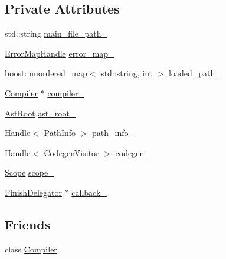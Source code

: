 \subsection*{Private Attributes}
\begin{DoxyCompactItemize}
\item 
std::string \hyperlink{classmocha_1_1_compiler_1_1_ptr_impl_afcc8e563ce271f85ea12dc210e37aa25}{main\_\-file\_\-path\_\-}
\item 
\hyperlink{classmocha_1_1_handle}{ErrorMapHandle} \hyperlink{classmocha_1_1_compiler_1_1_ptr_impl_ad1223329a891180cf83507aa0b76d2d5}{error\_\-map\_\-}
\item 
boost::unordered\_\-map$<$ std::string, int $>$ \hyperlink{classmocha_1_1_compiler_1_1_ptr_impl_a643001afd824defc612edd827e989347}{loaded\_\-path\_\-}
\item 
\hyperlink{classmocha_1_1_compiler}{Compiler} $\ast$ \hyperlink{classmocha_1_1_compiler_1_1_ptr_impl_adc125764e2552f0aa8485a660154c42c}{compiler\_\-}
\item 
\hyperlink{classmocha_1_1_ast_root}{AstRoot} \hyperlink{classmocha_1_1_compiler_1_1_ptr_impl_aa3e10b635c9b30e4b6ae1f8231e09655}{ast\_\-root\_\-}
\item 
\hyperlink{classmocha_1_1_handle}{Handle}$<$ \hyperlink{classmocha_1_1_path_info}{PathInfo} $>$ \hyperlink{classmocha_1_1_compiler_1_1_ptr_impl_a06189a50f7b98891cf31729de136e330}{path\_\-info\_\-}
\item 
\hyperlink{classmocha_1_1_handle}{Handle}$<$ \hyperlink{classmocha_1_1_codegen_visitor}{CodegenVisitor} $>$ \hyperlink{classmocha_1_1_compiler_1_1_ptr_impl_a95fb6e134b0d031f52ce39a7e349ee8f}{codegen\_\-}
\item 
\hyperlink{classmocha_1_1_scope}{Scope} \hyperlink{classmocha_1_1_compiler_1_1_ptr_impl_a967217946616587d9925a71ac093355b}{scope\_\-}
\item 
\hyperlink{classmocha_1_1_finish_delegator}{FinishDelegator} $\ast$ \hyperlink{classmocha_1_1_compiler_1_1_ptr_impl_afe8e99051d3858bb1eb62c6d079ab40f}{callback\_\-}
\end{DoxyCompactItemize}
\subsection*{Friends}
\begin{DoxyCompactItemize}
\item 
class \hyperlink{classmocha_1_1_compiler_1_1_ptr_impl_a5f904e96618a83d59208fb22cdf11ff5}{Compiler}
\end{DoxyCompactItemize}


